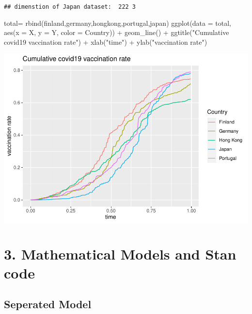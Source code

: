 \documentclass[
]{article}
\newenvironment{Shaded}{\begin{snugshade}}{\end{snugshade}}
\newcommand{\AttributeTok}[1]{\textcolor[rgb]{0.77,0.63,0.00}{#1}}
\newcommand{\FunctionTok}[1]{\textcolor[rgb]{0.00,0.00,0.00}{#1}}
\newcommand{\NormalTok}[1]{#1}
\newcommand{\OtherTok}[1]{\textcolor[rgb]{0.56,0.35,0.01}{#1}}
\newcommand{\SpecialCharTok}[1]{\textcolor[rgb]{0.00,0.00,0.00}{#1}}
\newcommand{\StringTok}[1]{\textcolor[rgb]{0.31,0.60,0.02}{#1}}
\begin{document}
\begin{verbatim}
## dimenstion of Japan dataset:  222 3
\end{verbatim}

\begin{Shaded}
\begin{Highlighting}[]
\NormalTok{total}\OtherTok{=} \FunctionTok{rbind}\NormalTok{(finland,germany,hongkong,portugal,japan)}
\FunctionTok{ggplot}\NormalTok{(}\AttributeTok{data =}\NormalTok{ total, }\FunctionTok{aes}\NormalTok{(}\AttributeTok{x =}\NormalTok{ X, }\AttributeTok{y =}\NormalTok{ Y, }\AttributeTok{color =}\NormalTok{ Country)) }\SpecialCharTok{+}
    \FunctionTok{geom\_line}\NormalTok{() }\SpecialCharTok{+}
    \FunctionTok{ggtitle}\NormalTok{(}\StringTok{"Cumulative covid19 vaccination rate"}\NormalTok{) }\SpecialCharTok{+}
    \FunctionTok{xlab}\NormalTok{(}\StringTok{"time"}\NormalTok{) }\SpecialCharTok{+} \FunctionTok{ylab}\NormalTok{(}\StringTok{"vaccination rate"}\NormalTok{)}
\end{Highlighting}
\end{Shaded}

\includegraphics{bda_project_files/figure-latex/unnamed-chunk-7-1.pdf}

\hypertarget{mathematical-models-and-stan-code}{%
\section{3. Mathematical Models and Stan
code}\label{mathematical-models-and-stan-code}}

\hypertarget{seperated-model}{%
\subsection{Seperated Model}\label{seperated-model}}
\end{document}
